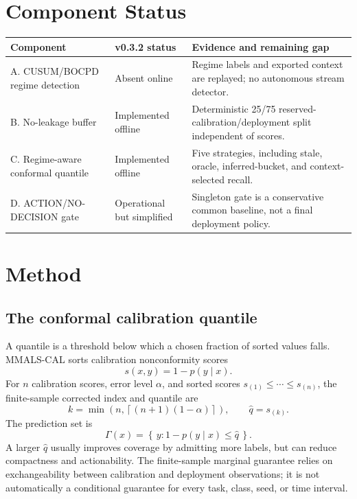 \documentclass[10pt]{article}
\newcommand{\mmalscal}{\textsc{MMALS-CAL}}
\begin{document}
\section{Component Status}
\begin{table}[H]
\centering\small
\begin{tabularx}{\linewidth}{l l X}
\toprule
Component & v0.3.2 status & Evidence and remaining gap\\
\midrule
A. CUSUM/BOCPD regime detection & Absent online & Regime labels and exported context are replayed; no autonomous stream detector.\\
B. No-leakage buffer & Implemented offline & Deterministic 25/75 reserved-calibration/deployment split independent of scores.\\
C. Regime-aware conformal quantile & Implemented offline & Five strategies, including stale, oracle, inferred-bucket, and context-selected recall.\\
D. ACTION/NO-DECISION gate & Operational but simplified & Singleton gate is a conservative common baseline, not a final deployment policy.\\
\bottomrule
\end{tabularx}
\end{table}



\section{Method}
\subsection{The conformal calibration quantile}
A quantile is a threshold below which a chosen fraction of sorted values falls. \mmalscal{} sorts calibration nonconformity scores
\begin{equation}
s(x,y)=1-p(y\mid x).
\end{equation}
For $n$ calibration scores, error level $\alpha$, and sorted scores $s_{(1)}\leq\cdots\leq s_{(n)}$, the finite-sample corrected index and quantile are
\begin{equation}
k=\min\left(n,\left\lceil(n+1)(1-\alpha)\right\rceil\right),\qquad \hat q=s_{(k)}.
\end{equation}
The prediction set is
\begin{equation}
\Gamma(x)=\left\{\, y:1-p(y\mid x)\leq\hat q \,\right\}.
\end{equation}
A larger $\hat q$ usually improves coverage by admitting more labels, but can reduce compactness and actionability. The finite-sample marginal guarantee relies on exchangeability between calibration and deployment observations; it is not automatically a conditional guarantee for every task, class, seed, or time interval.
\end{document}
